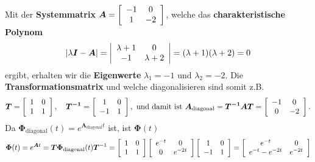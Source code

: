 Mit der {\bf Systemmatrix} $\boldsymbol{A}=\left
[ \begin{array}{c c} -1 & 0 \\ 1 &-2 \end{array}\right ]$, welche das
{\bf charakteristische Polynom}
\begin{equation*}
 \left | \lambda\boldsymbol{I}-\boldsymbol{A} \right | =\left
  |\begin{array}{c c} \lambda+1 & 0 \\ -1 & \lambda+2
  \end{array}\right |=(\lambda+1)(\lambda+2)=0
\end{equation*}
 ergibt, erhalten wir
die {\bf Eigenwerte} $\lambda_1=-1$ und $\lambda_2=-2$. Die {\bf
  Transformationsmatrix}  und
 welche  diagonalisieren sind somit z.B.
\begin{equation*}
\boldsymbol{T}=\left [ 
\begin{array}{c c}
1 & 0 \\
1 & 1\\
\end{array}
\right ],\quad \boldsymbol{T^{-1}}= 
\left [ 
\begin{array}{c c}
1 & 0 \\
-1 & 1\\
\end{array}
\right ],\text{~und damit ist~}\boldsymbol{A_{\text{diagonal}}}=\boldsymbol{T^{-1}AT}=
\left [ 
\begin{array}{c c}
-1 & 0 \\
0 & -2\\
\end{array}
\right ].
\end{equation*}
Da $\boldsymbol{\Phi}_{\text{diagonal}}(t)=e^{\boldsymbol{A}_{\text{diagonal}}t}$ ist, ist $\boldsymbol{\Phi}(t)$
\begin{equation*}
\boldsymbol{\Phi}(t)=e^{\boldsymbol{A}t}=\boldsymbol{T\Phi}_{\text{diagonal}}(t)\boldsymbol{T}^{-1}=\left [ 
\begin{array}{c c}
1 & 0 \\
1 & 1\\
\end{array}
\right ] 
\left [ 
\begin{array}{c c}
e^{-t} & 0 \\
0 & e^{-2t}\\
\end{array}
\right ]
\left [ 
\begin{array}{c c}
1 & 0 \\
-1 & 1\\
\end{array}
\right ]=
\left [ 
\begin{array}{c c}
e^{-t} & 0 \\
e^{-t} -e^{-2t}& e^{-2t}\\
\end{array}
\right ]
\end{equation*}
